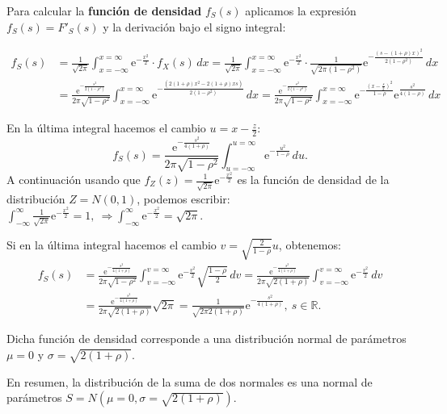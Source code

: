 \documentclass[]{book}
\begin{document}
Para calcular la \textbf{función de densidad} \(f_S(s)\) aplicamos la expresión \(f_S(s)=F'_S(s)\) y la derivación bajo el signo integral:

\[
\begin{array}{rl}
f_S(s) & = \frac{1}{\sqrt{2\pi}}\int_{x=-\infty}^{x=\infty} \mathrm{e}^{-\frac{x^2}{2}}\cdot f_X(s)\, dx = \frac{1}{\sqrt{2\pi}}\int_{x=-\infty}^{x=\infty} \mathrm{e}^{-\frac{x^2}{2}}\cdot \frac{1}{\sqrt{2\pi (1-\rho^2)}}\mathrm{e}^{-\frac{(s-(1+\rho)x)^2}{2(1-\rho^2)}}\, dx \\ & = \frac{\mathrm{e}^{-\frac{s^2}{2(1-\rho^2)}}}{2\pi\sqrt{1-\rho^2}} \int_{x=-\infty}^{x=\infty} \mathrm{e}^{-\frac{(2(1+\rho) x^2-2(1+\rho)xs)}{2(1-\rho^2)}}\, dx= \frac{\mathrm{e}^{-\frac{s^2}{2(1-\rho^2)}}}{2\pi\sqrt{1-\rho^2}} \int_{x=-\infty}^{x=\infty} \mathrm{e}^{-\frac{\left(x-\frac{s}{2}\right)^2}{1-\rho}}\mathrm{e}^{\frac{s^2}{4(1-\rho)}}\, dx
\end{array}
\]

En la última integral hacemos el cambio \(u=x-\frac{z}{2}\):
\[
f_S(s)  =\frac{\mathrm{e}^{-\frac{s^2}{4(1+\rho)}}}{2\pi\sqrt{1-\rho^2}} \int_{u=-\infty}^{u=\infty} \mathrm{e}^{-\frac{u^2}{1-\rho}}\, du.
\]
A continuación usando que \(f_Z(z)=\frac{1}{\sqrt{2\pi}}\mathrm{e}^{-\frac{x^2}{2}}\) es la función de densidad de la distribución \(Z=N(0,1)\), podemos escribir: \(\int_{-\infty}^\infty \frac{1}{\sqrt{2\pi}}\mathrm{e}^{-\frac{x^2}{2}}=1,\ \Rightarrow \int_{-\infty}^\infty \mathrm{e}^{-\frac{x^2}{2}}=\sqrt{2\pi}.\)

Si en la última integral hacemos el cambio \(v=\sqrt{\frac{2}{1-\rho}}u\), obtenemos:
\[
\begin{array}{rl}
f_S(s)  & = \frac{\mathrm{e}^{-\frac{s^2}{4(1+\rho)}}}{2\pi\sqrt{1-\rho^2}}\int_{v=-\infty}^{v=\infty}\mathrm{e}^{-\frac{v^2}{2}} \sqrt{\frac{1-\rho}{2}}\, dv= \frac{\mathrm{e}^{-\frac{s^2}{4(1+\rho)}}}{2\pi\sqrt{2(1+\rho)}}\int_{v=-\infty}^{v=\infty}\mathrm{e}^{-\frac{v^2}{2}} \, dv \\ & = \frac{\mathrm{e}^{-\frac{s^2}{4(1+\rho)}}}{2\pi\sqrt{2(1+\rho)}} \sqrt{2\pi}= \frac{1}{\sqrt{2\pi 2(1+\rho)}}\mathrm{e}^{-\frac{s^2}{4(1+\rho)}},\ s\in\mathbb{R}.
\end{array}
\]

Dicha función de densidad corresponde a una distribución normal de parámetros \(\mu =0\) y \(\sigma = \sqrt{2(1+\rho)}\).

En resumen, la distribución de la suma de dos normales es una normal de parámetros \(S=N(\mu=0,\sigma = \sqrt{2(1+\rho)})\).
\end{document}
